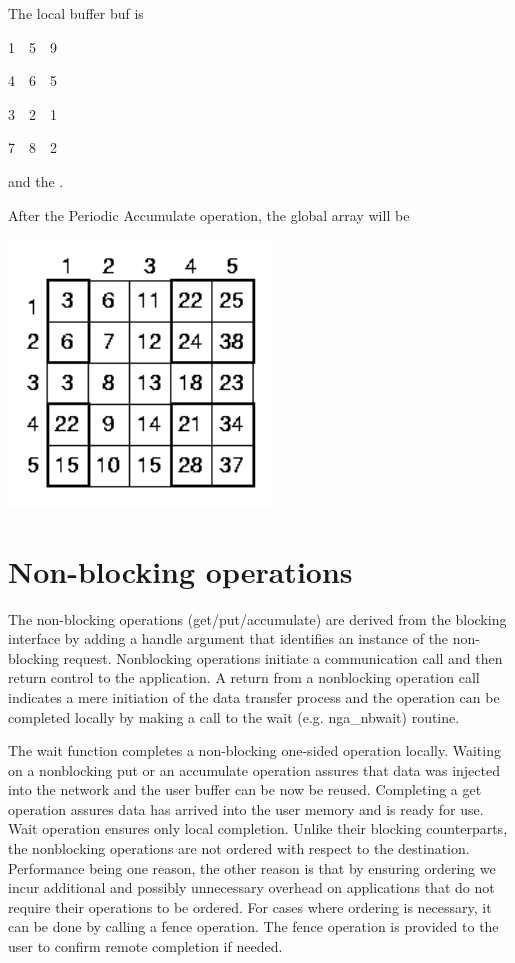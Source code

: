 The local buffer buf is
\begin{lyxcode}
1~~5~~9~

4~~6~~5~

3~~2~~1~

7~~8~~2
\end{lyxcode}
and the \texttt{}.

After the Periodic Accumulate operation, the global array will be

\includegraphics[width=7cm]{periodic5}


\section{Non-blocking operations}

The non-blocking operations (get/put/accumulate) are derived from
the blocking interface by adding a handle argument that identifies
an instance of the non-blocking request. Nonblocking operations initiate
a communication call and then return control to the application. A
return from a nonblocking operation call indicates a mere initiation
of the data transfer process and the operation can be completed locally
by making a call to the wait (e.g. nga\_nbwait) routine.

The wait function completes a non-blocking one-sided operation locally.
Waiting on a nonblocking put or an accumulate operation assures that
data was injected into the network and the user buffer can be now
be reused. Completing a get operation assures data has arrived into
the user memory and is ready for use. Wait operation ensures only
local completion. Unlike their blocking counterparts, the nonblocking
operations are not ordered with respect to the destination. Performance
being one reason, the other reason is that by ensuring ordering we
incur additional and possibly unnecessary overhead on applications
that do not require their operations to be ordered. For cases where
ordering is necessary, it can be done by calling a fence operation.
The fence operation is provided to the user to confirm remote completion
if needed.

